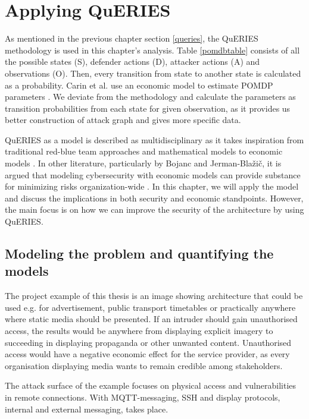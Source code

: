 \chapter{Applying QuERIES} \label{analysis}

As mentioned in the previous chapter section \ref{queries}, the
QuERIES methodology is used in this chapter's analysis. Table
\ref{pomdbtable} consists of all the possible states (S), defender
actions (D), attacker actions (A) and observations (O). Then, every
transition from state to another state is calculated as a
probability. Carin et al. use an economic model to estimate POMDP
parameters \cite{carin2008cybersecurity}. We deviate from the
methodology and calculate the parameters as transition probabilities
from each state for given observation, as it provides us better
construction of attack graph and gives more specific data.

QuERIES as a model is described as multidisciplinary as it takes
inspiration from traditional red-blue team approaches and mathematical
models to economic models \cite{hughes2013quantitative}. In other
literature, particularly by Bojanc and Jerman-Blažič, it is argued that
modeling cybersecurity with economic models can provide substance for
minimizing risks organization-wide \cite{jerman2008economic}. In this
chapter, we will apply the model and discuss the implications in both
security and economic standpoints. However, the main focus is on how we can improve the security of the architecture by using QuERIES. 

\section{Modeling the problem and quantifying the models} \label{modprob}

The project example of this thesis is an image showing architecture
that could be used e.g. for advertisement, public transport timetables
or practically anywhere where static media should be presented. If an
intruder should gain unauthorised access, the results would be
anywhere from displaying explicit imagery to succeeding in displaying
propaganda or other unwanted content. Unauthorised access would have a
negative economic effect for the service provider, as every
organisation displaying media wants to remain credible among
stakeholders.

The attack surface of the example focuses on physical access
and vulnerabilities in remote connections. With MQTT-messaging, SSH
and display protocols, internal and external messaging, takes place.


